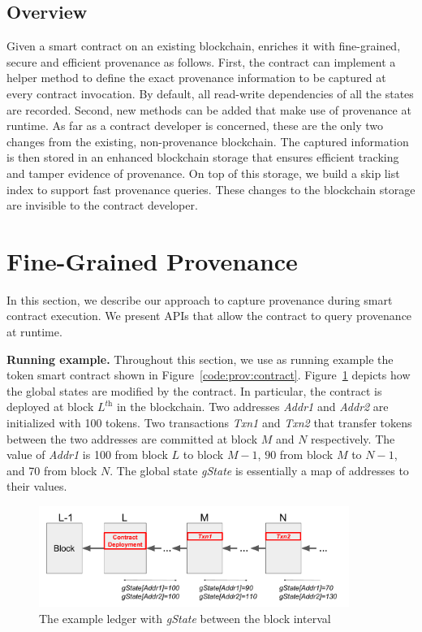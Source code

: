 \subsection{\fs Overview}
Given a smart contract on an existing blockchain, {\fs} enriches it with fine-grained, secure and
efficient provenance as follows. First, the contract can implement a helper
method to define the exact provenance information to be captured at every contract invocation. By default, all
read-write dependencies of all the states are recorded. Second, new methods can be added that make use of
provenance at runtime. As far as a contract developer is concerned, these are the only two changes from the
existing, non-provenance blockchain. The captured information is then stored in an enhanced blockchain storage
that ensures efficient tracking and tamper evidence of provenance.  On top of this storage, we build a skip
list index to support fast provenance queries.  These changes to the blockchain storage are invisible to the
contract developer.    


\section{Fine-Grained Provenance}
\label{prov:sec:capture}
In this section, we describe our approach to capture provenance during smart contract execution. We present
APIs that allow the contract to query provenance at runtime. 

\textbf{Running example.} Throughout this section, we use as running example the token smart contract  
shown in Figure~\ref{code:prov:contract}. Figure~\ref{diagram:prov:ledger} depicts how the global states are modified by the contract. In particular, the contract is deployed at block $L^\textit{th}$ in the blockchain. Two addresses
\textit{Addr1} and \textit{Addr2} are initialized with 100 tokens. Two transactions \textit{Txn1} and
\textit{Txn2} that transfer tokens between the two addresses are committed at block $M$ and $N$ respectively.
The value of \textit{Addr1} is 100 from block $L$ to block $M-1$, $90$ from block $M$ to $N-1$, and 70
from block $N$. The global state {\em gState} is essentially a map of addresses to their values. 

\begin{figure}
  \centering
  \includegraphics[width=0.9\textwidth]{diagram/provenance/contract.pdf}
  \caption{The example ledger with \textit{gState} between the block interval}
  \label{diagram:prov:ledger}
\end{figure}


